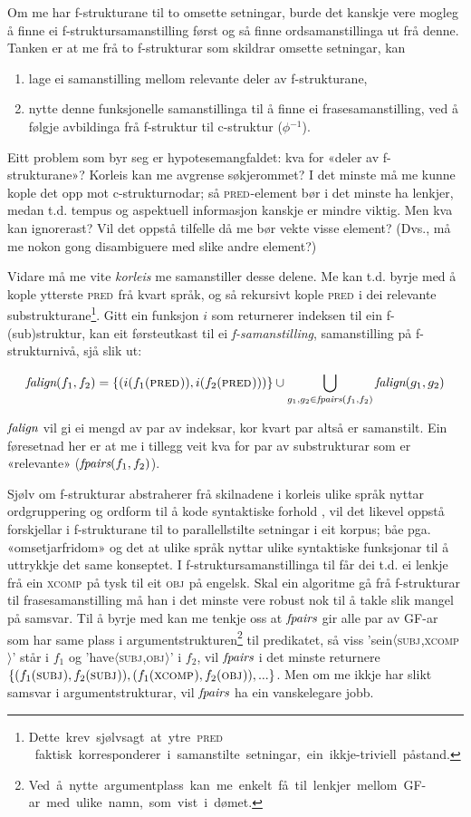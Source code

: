 \documentclass[11pt,a4paper,oneside,draft]{book}
\newcommand{\F}[2]{\textsc{#1}\ensuremath{_{#2}}}
\newcommand{\OBJ}{\F{obj}{}}
\newcommand{\XCOMP}{\F{xcomp}{}}
\newcommand{\SUBJ}{\F{subj}{}}
\newcommand{\PRED}{\F{pred}{}}
\newcommand{\falign}{\ensuremath{\operatorname{\emph{falign}}}}
\newcommand{\fpairs}{\ensuremath{\operatorname{\emph{fpairs}}}}
\begin{document}
Om me har f-strukturane til to omsette setningar, burde det kanskje
vere mogleg å finne ei f-struktursamanstilling først og så finne
ordsamanstillinga ut frå denne. Tanken er at me frå to f-strukturar
som skildrar omsette setningar, kan
\begin{enumerate}
\item lage ei samanstilling mellom relevante deler av f-strukturane,
\item nytte denne funksjonelle samanstillinga til å finne ei
   frasesamanstilling, ved å følgje avbildinga frå f-struktur til
   c-struktur ($\phi{}^{-1}$).
\end{enumerate}
Eitt problem som byr seg er hypotesemangfaldet: kva for «deler av
f-strukturane»? Korleis kan me avgrense søkjerommet? I det minste må
me kunne kople det opp mot c-strukturnodar; så \PRED-element bør i det
minste ha lenkjer, medan t.d. tempus og aspektuell informasjon kanskje
er mindre viktig. Men kva kan ignorerast? Vil det oppstå tilfelle då
me bør vekte visse element? (Dvs., må me nokon gong disambiguere med
slike andre element?)

Vidare må me vite \emph{korleis} me samanstiller desse delene. Me kan
t.d. byrje med å kople ytterste \PRED{} frå kvart språk, og så
rekursivt kople \PRED{} i dei relevante
substrukturane\footnote{Dette~krev~sjølvsagt~at~ytre~\PRED{}~faktisk~korresponderer~i~samanstilte~setningar,~ein~ikkje-triviell~påstand.}. Gitt
ein funksjon $i$ som returnerer indeksen til ein f-(sub)struktur, kan
eit førsteutkast til ei \emph{f-samanstilling}, samanstilling på
f-strukturnivå, sjå slik ut:

\[
\falign(f_{1}, f_{2}) =
\{ (i(f_{1}(\PRED)), i(f_{2}(\PRED))) \}
\cup
\bigcup_{g_{1},g_{2}\in \fpairs(f_{1},f_{2})} \falign(g_{1}, g_{2})
\]

\falign{} vil gi ei mengd av par av indeksar, kor kvart par altså er
samanstilt. Ein føresetnad her er at me i tillegg veit kva for par av
substrukturar som er «relevante» ($\fpairs(f_{1},f_{2})$).

Sjølv om f-strukturar abstraherer frå skilnadene i korleis ulike språk
nyttar ordgruppering og ordform til å kode syntaktiske forhold
\citep[s.~14]{bresnan2001lfs}, vil det likevel oppstå forskjellar i
f-strukturane til to parallellstilte setningar i eit korpus; båe
pga. «omsetjarfridom» og det at ulike språk nyttar ulike syntaktiske
funksjonar til å uttrykkje det same konseptet. I
f-struktursamanstillinga til \citet[s.~40]{riezler2006gmt} får dei
t.d. ei lenkje frå ein \XCOMP{} på tysk til eit \OBJ{} på
engelsk. Skal ein algoritme gå frå f-strukturar til frasesamanstilling
må han i det minste vere robust nok til å takle slik mangel på
samsvar. Til å byrje med kan me tenkje oss at \fpairs{} gir alle par
av GF-ar som har same plass i
argumentstrukturen\footnote{Ved~å~nytte~argumentplass~kan~me~enkelt~få~til~lenkjer~mellom~GF-ar~med~ulike~namn,~som~vist~i~dømet.}
til predikatet, så viss 'sein$\langle$\SUBJ,\XCOMP$\rangle$' står i
$f_{1}$ og 'have$\langle$\SUBJ,\OBJ$\rangle$' i $f_{2}$, vil \fpairs{}
i det minste returnere
$\{(f_{1}(\SUBJ),f_{2}(\SUBJ)),(f_{1}(\XCOMP),f_{2}(\OBJ)),...\}$.
Men om me ikkje har slikt samsvar i argumentstrukturar, vil \fpairs{}
ha ein vanskelegare jobb.
\end{document}
